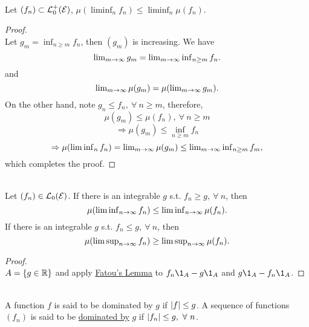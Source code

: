 \begin{theorem}\label{Fatou's Lemma}\ \\
Let $(f_n) \subset \mathcal{L}_0^+(\mathcal{E})$, $\mu(\liminf_n f_n) \leq \liminf_n \mu(f_n)$.
\end{theorem}
\begin{proof}\ \\
Let $g_m = \inf_{n \geq m} f_n$, then $(g_m)$ is increasing. We have
\begin{equation*}
    \textstyle\lim_{m \to \infty} g_m = \textstyle\lim_{m \to \infty} \inf_{n\geq m} f_n.
\end{equation*}
and 
\begin{equation*}
    \textstyle\lim_{m \to \infty} \mu(g_m) = \mu(\textstyle\lim_{m \to \infty} g_m).
\end{equation*}
On the other hand, note $g_n \leq f_n,\ \forall\ n \geq m$, therefore,
\begin{equation*}
    \mu(g_m) \leq \mu(f_n),\ \forall\ n \geq m
\end{equation*}
\begin{equation*}
    \Rightarrow \mu(g_m) \leq \inf_{n \geq m} f_n
\end{equation*}
\begin{equation*}
    \Rightarrow \mu(\liminf_n f_n) = \limm m \infty \mu(g_m) \leq \limm m \infty \inf_{n \geq m} f_m,
\end{equation*}
which completes the proof.
\end{proof}

\begin{corollary}\ \\
Let $(f_n) \in \mathcal{L}_0(\mathcal{E})$. If there is an integrable $g$ s.t. $f_n \geq g,\ \forall\ n$, then
\begin{equation*}
    \mu(\textstyle\liminf_{n \to \infty} f_n) \leq \textstyle\liminf_{n \to \infty} \mu(f_n).
\end{equation*}
If there is an integrable $g$ s.t. $f_n \leq g,\ \forall\ n$, then 
\begin{equation*}
    \mu(\textstyle\limsup_{n \to \infty} f_n) \geq \textstyle\limsup_{n \to \infty} \mu(f_n).
\end{equation*}
\end{corollary}
\begin{proof}\ \\
$A = \{g \in \mathbb{R}\}$ and apply \hyperref[Fatou's Lemma]{Fatou's Lemma} to $f_n\1_A - g \1_A$ and $g \1_A - f_n \1_A$.
\end{proof}


\begin{definition}\ \\
A function $f$ is said to be dominated by $g$ if $\abs{f} \leq g$. A sequence of functions $(f_n)$ is said to be \underline{dominated by} $g$ if $\abs{f_n} \leq g,\ \forall\ n$.
\end{definition}

